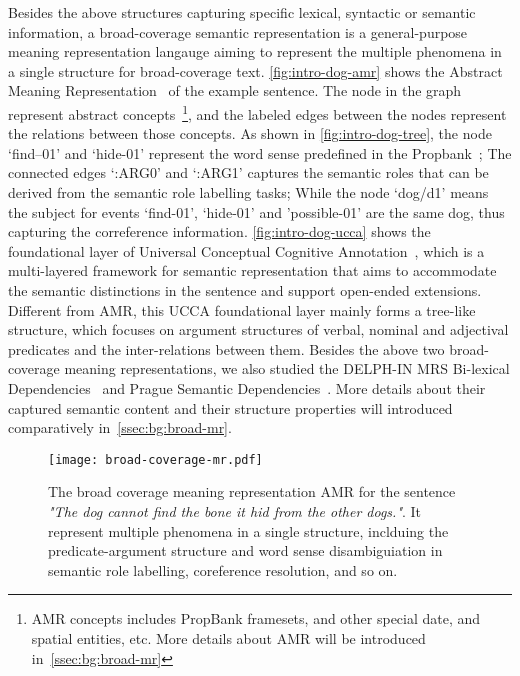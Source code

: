  Besides
the above structures capturing specific lexical, syntactic or semantic
information, a broad-coverage semantic representation is a
general-purpose meaning representation langauge aiming to represent
the multiple phenomena in a single structure for broad-coverage
text. \autoref{fig:intro-dog-amr} shows the Abstract Meaning
Representation~\citep[\textbf{AMR},][]{Ban:Bon:Cai:13} of the example
sentence. The node in the graph represent abstract
concepts~\footnote{AMR concepts includes PropBank framesets, and other
  special date, and spatial entities, etc. More details about AMR will
  be introduced in~\autoref{ssec:bg:broad-mr}}, and the labeled edges
between the nodes represent the relations between those concepts. As
shown in \autoref{fig:intro-dog-tree}, the node `find--01' and
`hide-01' represent the word sense predefined in the
Propbank~\cite{Kin:Pal:02}; The connected edges `:ARG0' and `:ARG1'
captures the semantic roles that can be derived from the semantic role
labelling tasks; While the node `dog/d1' means the subject for events
`find-01', `hide-01' and 'possible-01' are the same dog, thus
capturing the correference information. \autoref{fig:intro-dog-ucca}
shows the foundational layer of Universal Conceptual Cognitive
Annotation~\citep[\textbf{UCCA},][]{Abe:Rap:13b}, which is a
multi-layered framework for semantic representation that aims to
accommodate the semantic distinctions in the sentence and support
open-ended extensions. Different from AMR, this UCCA foundational
layer mainly forms a tree-like structure, which focuses on argument
structures of verbal, nominal and adjectival predicates and the
inter-relations between them. Besides the above two broad-coverage
meaning representations, we also studied the DELPH-IN MRS Bi-lexical
Dependencies~\cite[DM,][]{ivanova2012did} and Prague Semantic
Dependencies~\cite[PSD,][]{hajic2012announcing,miyao2014house}. More
details about their captured semantic content and their structure
properties will introduced comparatively
in~\autoref{ssec:bg:broad-mr}.

\begin{figure}[!th]
\centering
\texttt{[image: broad-coverage-mr.pdf]}
\caption{\label{fig:intro-dog-amr} The broad coverage meaning
  representation AMR for the sentence \textit{"The dog cannot find the
    bone it hid from the other dogs."}. It represent multiple
  phenomena in a single structure, inclduing the predicate-argument
  structure and word sense disambiguiation in semantic role labelling,
  coreference resolution, and so on.}
\end{figure}


